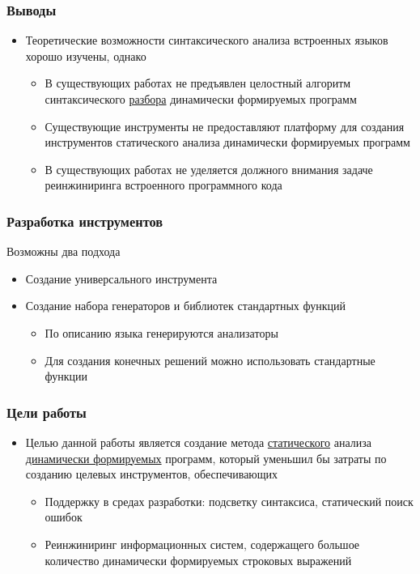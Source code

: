 \documentclass{beamer}
\begin{document}
\begin{frame}
    \transwipe[direction=90]
    \frametitle{Выводы}
    \begin{itemize}
      \item Теоретические возможности синтаксического анализа встроенных языков хорошо изучены, однако
      \begin{itemize}
        \item В существующих работах не предъявлен целостный алгоритм синтаксического \underline{разбора} динамически формируемых программ
        \item Существующие инструменты не предоставляют платформу для создания инструментов статического анализа динамически формируемых программ
        \item В существующих работах не уделяется должного внимания задаче реинжиниринга встроенного программного кода
      \end{itemize}
    \end{itemize}
\end{frame}

\begin{frame}
    \transwipe[direction=90]
    \frametitle{Разработка инструментов}
    Возможны два подхода  
    \begin{itemize}
      \item Создание универсального инструмента
      \item Создание набора генераторов и библиотек стандартных функций
      \begin{itemize}
        \item По описанию языка генерируются анализаторы
        \item Для создания конечных решений можно использовать стандартные функции
      \end{itemize}
    \end{itemize}
\end{frame}

\begin{frame}
    \transwipe[direction=90]
    \frametitle{Цели работы}
    \begin{itemize}
        \item Целью данной работы является создание метода \underline{статического} анализа \underline{динамически формируемых} программ, 
        который уменьшил бы затраты по созданию целевых инструментов, обеспечивающих
        \begin{itemize}
            \item Поддержку в средах разработки: подсветку синтаксиса, статический поиск ошибок
            \item Реинжиниринг информационных систем, содержащего большое количество динамически формируемых строковых 
        выражений
        \end{itemize}
    \end{itemize}
\end{frame}
\end{document}
